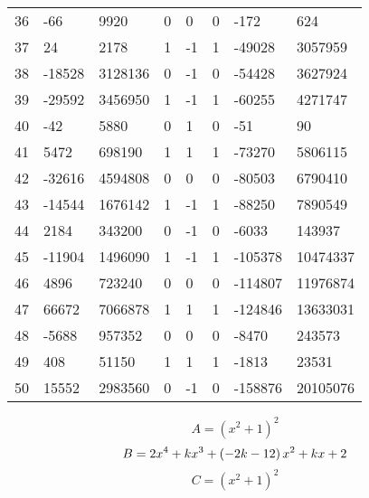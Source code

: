 \documentclass{amsart}
\begin{document}
\begin{longtable}{|l|l|l|lllll|}
36&-66&9920&0&0&0&-172&624\\
37&24&2178&1&-1&1&-49028&3057959\\
38&-18528&3128136&0&-1&0&-54428&3627924\\
39&-29592&3456950&1&-1&1&-60255&4271747\\
40&-42&5880&0&1&0&-51&90\\
41&5472&698190&1&1&1&-73270&5806115\\
42&-32616&4594808&0&0&0&-80503&6790410\\
43&-14544&1676142&1&-1&1&-88250&7890549\\
44&2184&343200&0&-1&0&-6033&143937\\
45&-11904&1496090&1&-1&1&-105378&10474337\\
46&4896&723240&0&0&0&-114807&11976874\\
47&66672&7066878&1&1&1&-124846&13633031\\
48&-5688&957352&0&0&0&-8470&243573\\
49&408&51150&1&1&1&-1813&23531\\
50&15552&2983560&0&-1&0&-158876&20105076\\
\hline
\end{longtable}
$$A=(x^2
 + 1)^{2}$$
$$B=2\*x^4
 + k\*x^3
 + \left(-2\*k
 - 12\right) \*x^2
 + k\*x
 + 2$$
$$C=(x^2
 + 1)^{2}$$
\end{document}
